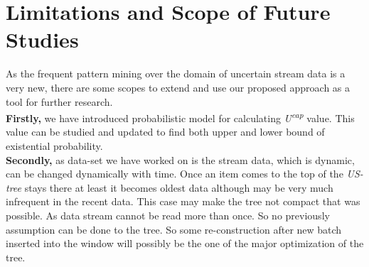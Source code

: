 \section{Limitations and Scope of Future Studies}
As the frequent pattern mining over the domain of uncertain stream data is a very new, there are some scopes to extend and use our proposed approach as a tool for further research.\\ 
\textbf{Firstly,} we have introduced probabilistic model for calculating \emph{U\textsuperscript{cap}} value. This value can be studied and updated to find both upper and lower bound of existential probability.\\
\textbf{Secondly,} as data-set we have worked on is the stream data, which is dynamic, can be changed dynamically with time. Once an item comes to the top of the \emph{US-tree} stays there at least it becomes oldest data although may be very much infrequent in the recent data. This case may make the tree not compact that was possible. As data stream cannot be read more than once. So no previously assumption can be done to the tree. So some re-construction after new batch inserted into the window will possibly be the one of the major optimization of the tree.